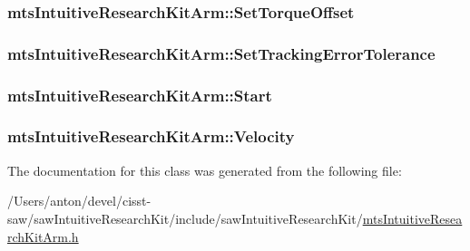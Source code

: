 \subsubsection[{Set\+Torque\+Offset}]{ mts\+Intuitive\+Research\+Kit\+Arm\+::\+Set\+Torque\+Offset}\label{classmts_intuitive_research_kit_arm_a438ad77dd476331ccb13493748867f14}
\hypertarget{classmts_intuitive_research_kit_arm_aa8702bf5242408d810c3b894e7ad3f3f}{}
\subsubsection[{Set\+Tracking\+Error\+Tolerance}]{ mts\+Intuitive\+Research\+Kit\+Arm\+::\+Set\+Tracking\+Error\+Tolerance}\label{classmts_intuitive_research_kit_arm_aa8702bf5242408d810c3b894e7ad3f3f}
\hypertarget{classmts_intuitive_research_kit_arm_a94cbc8bebf4566ca94cb03cc007186f7}{}
\subsubsection[{Start}]{ mts\+Intuitive\+Research\+Kit\+Arm\+::\+Start}\label{classmts_intuitive_research_kit_arm_a94cbc8bebf4566ca94cb03cc007186f7}
\hypertarget{classmts_intuitive_research_kit_arm_a54046b45c03a94fcacb9a3b335a19c0a}{}
\subsubsection[{Velocity}]{ mts\+Intuitive\+Research\+Kit\+Arm\+::\+Velocity}\label{classmts_intuitive_research_kit_arm_a54046b45c03a94fcacb9a3b335a19c0a}


The documentation for this class was generated from the following file\+:\begin{DoxyCompactItemize}
\item 
/\+Users/anton/devel/cisst-\/saw/saw\+Intuitive\+Research\+Kit/include/saw\+Intuitive\+Research\+Kit/\hyperlink{mts_intuitive_research_kit_arm_8h}{mts\+Intuitive\+Research\+Kit\+Arm.\+h}\end{DoxyCompactItemize}
